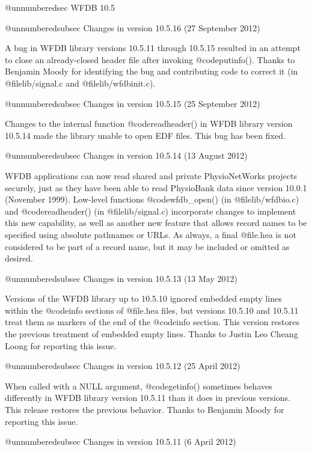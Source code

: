 {{{{{{{{@unnumberedsec WFDB 10.5

@unnumberedsubsec Changes in version 10.5.16 (27 September 2012)

A bug in WFDB library versions 10.5.11 through 10.5.15 resulted in an attempt
to close an already-closed header file after invoking @code{putinfo()}.  Thanks
to Benjamin Moody for identifying the bug and contributing code to correct it
(in @file{lib/signal.c} and @file{lib/wfdbinit.c}).

@unnumberedsubsec Changes in version 10.5.15 (25 September 2012)

Changes to the internal function @code{readheader()} in WFDB library version
10.5.14 made the library unable to open EDF files.  This bug has been
fixed.

@unnumberedsubsec Changes in version 10.5.14 (13 August 2012)

WFDB applications can now read shared and private PhysioNetWorks projects
securely, just as they have been able to read PhysioBank data since version
10.0.1 (November 1999).  Low-level functions @code{wfdb_open()} (in
@file{lib/wfdbio.c}) and @code{readheader()} (in @file{lib/signal.c})
incorporate changes to implement this new capability, as well as another new
feature that allows record names to be specified using absolute pathnames or
URLs.  As always, a final @file{.hea} is not considered to be part of a record
name, but it may be included or omitted as desired.

@unnumberedsubsec Changes in version 10.5.13 (13 May 2012)

Versions of the WFDB library up to 10.5.10 ignored embedded empty lines
within the @code{info} sections of @file{.hea} files, but versions 10.5.10 and
10.5.11 treat them as markers of the end of the @code{info} section.  This
version restores the previous treatment of embedded empty lines.  Thanks
to Justin Leo Cheang Loong for reporting this issue.

@unnumberedsubsec Changes in version 10.5.12 (25 April 2012)

When called with a NULL argument, @code{getinfo()} sometimes behaves
differently in WFDB library version 10.5.11 than it does in previous versions.
This release restores the previous behavior.  Thanks to Benjamin Moody for
reporting this issue.

@unnumberedsubsec Changes in version 10.5.11 (6 April 2012)

}}}}}}}}
